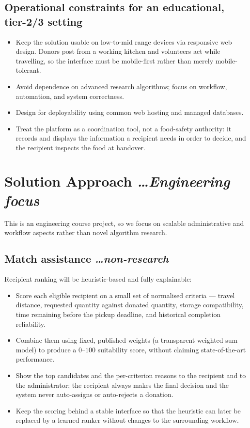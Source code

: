 \documentclass[11pt,a4paper]{article}
\newcommand{\BvrHint}[1]{%
  {\normalfont\normalsize\itshape\hfill #1}}
\begin{document}
\subsection{Operational constraints for an educational, tier-2/3 setting}
\begin{itemize}[leftmargin=0.7cm]
    \item Keep the solution usable on low-to-mid range devices via responsive web design. Donors post from a working kitchen and volunteers act while travelling, so the interface must be mobile-first rather than merely mobile-tolerant.
    \item Avoid dependence on advanced research algorithms; focus on workflow, automation, and system correctness.
    \item Design for deployability using common web hosting and managed databases.
    \item Treat the platform as a coordination tool, not a food-safety authority: it records and displays the information a recipient needs in order to decide, and the recipient inspects the food at handover.
\end{itemize}

\section{Solution Approach %
\BvrHint{\ldots Engineering focus}}
This is an engineering course project, so we focus on scalable administrative and workflow aspects rather than novel algorithm research.

\subsection{Match assistance %
\BvrHint{\ldots non-research}}
Recipient ranking will be heuristic-based and fully explainable:
\begin{itemize}[leftmargin=0.7cm]
    \item Score each eligible recipient on a small set of normalised criteria --- travel distance, requested quantity against donated quantity, storage compatibility, time remaining before the pickup deadline, and historical completion reliability.
    \item Combine them using fixed, published weights (a transparent weighted-sum model) to produce a $0$--$100$ suitability score, without claiming state-of-the-art performance.
    \item Show the top candidates and the per-criterion reasons to the recipient and to the administrator; the recipient always makes the final decision and the system never auto-assigns or auto-rejects a donation.
    \item Keep the scoring behind a stable interface so that the heuristic can later be replaced by a learned ranker without changes to the surrounding workflow.
\end{itemize}
\end{document}
